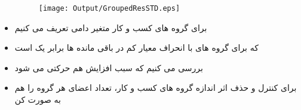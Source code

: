 \begin{itemize}
	\lr{\begin{LTR}
	\begin{table}[htbp]
			\centering
			\resizebox{0.8\textwidth}{!}{
				
			}
			\label{tab:ResidualTrunStdSummary}
		\end{table}
	\end{LTR}}
	\begin{figure}[htbp]
		\centering
		\texttt{[image: Output/GroupedResSTD.eps]}
		\label{fig:GroupedResSTD}
	\end{figure}
	\item
	برای گروه های کسب و کار متغیر دامی تعریف می کنیم
		\item
		که برای گروه های با انحراف معیار کم در باقی مانده ها برابر یک است
			\item
			بررسی می کنیم که سبب افزایش هم حرکتی می شود
				\item
				برای کنترل و حذف اثر اندازه گروه های کسب و کار، تعداد اعضای هر گروه را هم به صورت کن
\lr{\begin{LTR}
		\begin{table}[htbp]
	\centering
			\resizebox{0.8\textwidth}{!}{
				\centering
				
			}
			\label{Turnovercrosssection}
		\end{table}
\end{LTR}}
%

\end{itemize}
